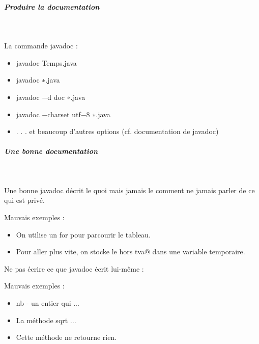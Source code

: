 \documentclass[11pt,a4paper]{article}
\begin{document}
            \par
        
			
		\subparagraph{Produire la documentation} 
		
					\textcolor{white}{.} \par
				
        La commande javadoc : 
        
					\begin{itemize}
				
			\item javadoc Temps.java
			\item javadoc ∗.java
			\item javadoc −d doc ∗.java
			\item javadoc −charset utf−8 ∗.java
			\item . . . et beaucoup d'autres options (cf. documentation de javadoc)
					\end{itemize}
				
            \par
        
			
		\subparagraph{Une bonne documentation} 
		
					\textcolor{white}{.} \par
				
        Une bonne javadoc d\'ecrit le quoi mais jamais le comment \rightarrow ne jamais parler de ce qui est priv\'e.
      
            \par
        
        Mauvais exemples :
        
					\begin{itemize}
				
			\item On utilise un for pour parcourir le tableau.
			\item Pour aller plus vite, on stocke le \verb@prix hors tva@ dans une variable temporaire.
					\end{itemize}
				
            \par
        
        Ne pas \'ecrire ce que javadoc \'ecrit lui-m\^eme :
      
            \par
        
        Mauvais exemples :
        
					\begin{itemize}
				
			\item nb - un entier qui ...
			\item La m\'ethode sqrt ...
			\item Cette m\'ethode ne retourne rien.
					\end{itemize}
				
\end{document}
